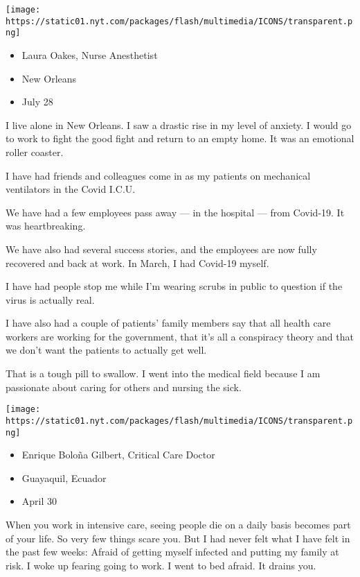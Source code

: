 \texttt{[image: https://static01.nyt.com/packages/flash/multimedia/ICONS/transparent.png]}

\begin{itemize}
\tightlist
\item
  Laura Oakes, Nurse Anesthetist
\item
  New Orleans
\item
  July 28
\end{itemize}

I live alone in New Orleans. I saw a drastic rise in my level of
anxiety. I would go to work to fight the good fight and return to an
empty home. It was an emotional roller coaster.

I have had friends and colleagues come in as my patients on mechanical
ventilators in the Covid I.C.U.

We have had a few employees pass away --- in the hospital --- from
Covid-19. It was heartbreaking.

We have also had several success stories, and the employees are now
fully recovered and back at work. In March, I had Covid-19 myself.

I have had people stop me while I'm wearing scrubs in public to question
if the virus is actually real.

I have also had a couple of patients' family members say that all health
care workers are working for the government, that it's all a conspiracy
theory and that we don't want the patients to actually get well.

That is a tough pill to swallow. I went into the medical field because I
am passionate about caring for others and nursing the sick.

\texttt{[image: https://static01.nyt.com/packages/flash/multimedia/ICONS/transparent.png]}

\begin{itemize}
\tightlist
\item
  Enrique Boloña Gilbert, Critical Care Doctor
\item
  Guayaquil, Ecuador
\item
  April 30
\end{itemize}

When you work in intensive care, seeing people die on a daily basis
becomes part of your life. So very few things scare you. But I had never
felt what I have felt in the past few weeks: Afraid of getting myself
infected and putting my family at risk. I woke up fearing going to work.
I went to bed afraid. It drains you.

